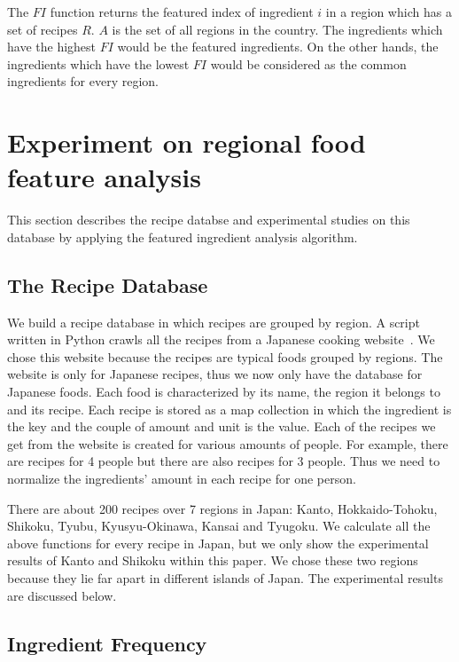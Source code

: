 \documentclass{sig-alternate}
\begin{document}
The $FI$ function returns the featured index of ingredient $i$ in a region which has a set of recipes $R$. $A$ is the set of all regions in the country. The ingredients which have the highest $FI$ would be the featured ingredients. On the other hands, the ingredients which have the lowest $FI$ would be considered as the common ingredients for every region.

\section{Experiment on regional food feature analysis}

This section describes the recipe databse and experimental studies on this database by applying the featured ingredient analysis algorithm.  

\subsection{The Recipe Database}

We build a recipe database in which recipes are grouped by region. A script written in Python crawls all the recipes from a Japanese cooking website~\cite{web:recipe}. We chose this website because the recipes are typical foods grouped by regions. The website is only for Japanese recipes, thus we now only have the database for Japanese foods. Each food is characterized by its name, the region it belongs to and its recipe. Each recipe is stored as a map collection in which the ingredient is the key and the couple of amount and unit is the value. Each of the recipes we get from the website is created for various amounts of people. For example, there are recipes for 4 people but there are also recipes for 3 people. Thus we need to normalize the ingredients' amount in each recipe for one person.

\par There are about 200 recipes over 7 regions in Japan: Kanto, Hokkaido-Tohoku, Shikoku, Tyubu, Kyusyu-Okinawa, Kansai and Tyugoku. We calculate all the above functions for every recipe in Japan, but we only show the experimental results of Kanto and Shikoku within this paper. We chose these two regions because they lie far apart in different islands of Japan. The experimental results are discussed below. 

\subsection{Ingredient Frequency}
\end{document}

